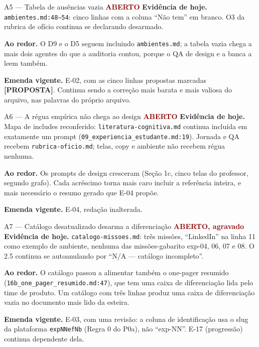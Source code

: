 \documentclass[11pt,a4paper]{article}
\newcommand{\aberto}{\textcolor{DarkRed}{\textbf{ABERTO}}}
\newcommand{\agravado}{\textcolor{DarkRed}{\textbf{ABERTO, agravado}}}
\begin{document}
\begin{achadobox}{A5 --- Tabela de ausências vazia \hfill \aberto}
\textbf{Evidência de hoje.} \texttt{ambientes.md:48--54}: cinco linhas com a coluna ``Não tem'' em
branco. O3 da rubrica de ofício continua se declarando desarmado.

\textbf{Ao redor.} O D9 e o D5 seguem incluindo \texttt{ambientes.md}; a tabela vazia chega a mais
dois agentes do que a auditoria contou, porque o QA de design e a banca a leem também.

\textbf{Emenda vigente.} E-02, com as cinco linhas propostas marcadas \textbf{[PROPOSTA]}. Continua
sendo a correção mais barata e mais valiosa do arquivo, nas palavras do próprio arquivo.
\end{achadobox}

\begin{achadobox}{A6 --- A régua empírica não chega ao design \hfill \aberto}
\textbf{Evidência de hoje.} Mapa de includes reconferido: \texttt{literatura-cognitiva.md} continua
incluída em exatamente um prompt (\texttt{09\_experiencia\_estudante.md:19}). Jornada e QA recebem
\texttt{rubrica-oficio.md}; telas, copy e ambiente não recebem régua nenhuma.

\textbf{Ao redor.} Os prompts de design cresceram (Seção 1c, cinco telas do professor, segundo
grafo). Cada acréscimo torna mais caro incluir a referência inteira, e mais necessário o resumo
gerado que E-04 propõe.

\textbf{Emenda vigente.} E-04, redação inalterada.
\end{achadobox}

\begin{achadobox}{A7 --- Catálogo desatualizado desarma a diferenciação \hfill \agravado}
\textbf{Evidência de hoje.} \texttt{catalogo-missoes.md}: três missões, ``LinkedIn'' na linha 11
como exemplo de ambiente, nenhuma das missões-gabarito exp-04, 06, 07 e 08. O 2.5 continua se
autoanulando por ``N/A --- catálogo incompleto''.

\textbf{Ao redor.} O catálogo passou a alimentar também o one-pager resumido
(\texttt{16b\_one\_pager\_resumido.md:47}), que tem uma caixa de diferenciação lida pelo time de
produto. Um catálogo com três linhas produz uma caixa de diferenciação vazia no documento mais
lido da esteira.

\textbf{Emenda vigente.} E-03, com uma revisão: a coluna de identificação usa o slug da plataforma
\texttt{expNNefNb} (Regra 0 do P0a), não ``exp-NN''. E-17 (progressão) continua dependente dela.
\end{achadobox}
\end{document}
